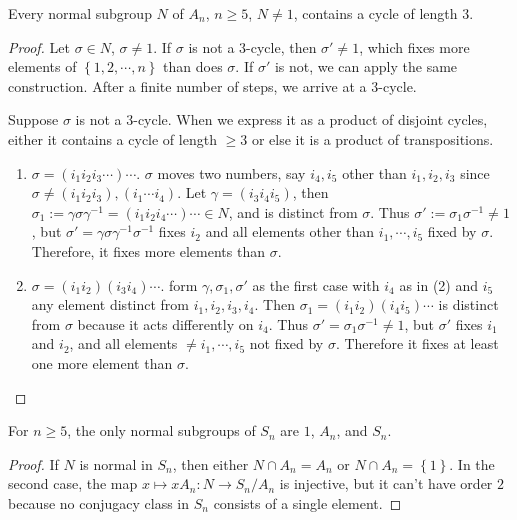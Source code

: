\begin{lemma}
  \label{lemma-Galois-alternating-group-2}
  Every normal subgroup \( N \) of \( A_n \), \( n \geq 5 \), \( N \neq 1 \), contains a cycle of length \( 3 \).
\end{lemma}
\begin{proof}
  Let \( \sigma \in N \), \( \sigma \neq 1 \).
  If \( \sigma \) is not a \( 3 \)-cycle, then \( \sigma' \neq 1 \), which fixes more elements of \( \left\lbrace 1, 2, \cdots, n \right\rbrace \) than does \( \sigma \).
  If \( \sigma' \) is not, we can apply the same construction.
  After a finite number of steps, we arrive at a \( 3 \)-cycle.

  Suppose \( \sigma \) is not a \( 3 \)-cycle.
  When we express it as a product of disjoint cycles, either it contains a cycle of length \( \geq 3 \) or else it is a product of transpositions.
  \begin{enumerate}
    \item \( \sigma = (i_1 i_2 i_3 \cdots) \cdots \).
      \( \sigma \) moves two numbers, say \( i_4, i_5 \) other than \( i_1, i_2, i_3 \) since \( \sigma \neq (i_1 i_2 i_3), (i_1 \cdots i_4) \).
      Let \( \gamma = (i_3 i_4 i_5) \), then \( \sigma_1 := \gamma \sigma \gamma^{-1} = (i_1 i_2 i_4 \cdots) \cdots \in N \), and is distinct from \( \sigma \).
      Thus \( \sigma' := \sigma_1 \sigma^{-1} \neq 1 \), but \( \sigma' = \gamma \sigma \gamma^{-1} \sigma^{-1} \) fixes \( i_2 \) and all elements other than \( i_1, \cdots, i_5 \) fixed by \( \sigma \).
      Therefore, it fixes more elements than \( \sigma \).
    \item \( \sigma = (i_1 i_2)(i_3 i_4) \cdots \).
      form \( \gamma, \sigma_1, \sigma' \) as the first case with \( i_4 \) as in (2) and \( i_5 \) any element distinct from \( i_1, i_2, i_3, i_4 \).
      Then \( \sigma_1 = (i_1 i_2)(i_4 i_5) \cdots \) is distinct from \( \sigma \) because it acts differently on \( i_4 \).
      Thus \( \sigma' = \sigma_1 \sigma^{-1} \neq 1 \), but \( \sigma' \) fixes \( i_1 \) and \( i_2 \), and all elements \( \neq i_1, \cdots, i_5 \) not fixed by \( \sigma \).
      Therefore it fixes at least one more element than \( \sigma \).
  \end{enumerate}
\end{proof}

\begin{corollary}
  \label{corollary-normal-subgroup-of-symmetric-group}
  For \( n \geq 5 \), the only normal subgroups of \( S_n \) are \( 1 \), \( A_n \), and \( S_n \).
\end{corollary}
\begin{proof}
  If \( N \) is normal in \( S_n \), then either \( N \cap A_n = A_n \) or \( N \cap A_n = \left\lbrace 1 \right\rbrace \).
  In the second case, the map \( x \mapsto x A_n: N \to S_n / A_n \) is injective, but it can't have order \( 2 \) because no conjugacy class in \( S_n \) consists of a single element.
\end{proof}


